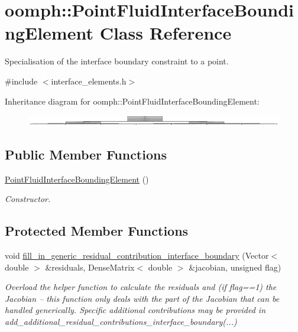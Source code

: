 \hypertarget{classoomph_1_1PointFluidInterfaceBoundingElement}{}\section{oomph\+:\+:Point\+Fluid\+Interface\+Bounding\+Element Class Reference}
\label{classoomph_1_1PointFluidInterfaceBoundingElement}


Specialisation of the interface boundary constraint to a point.  




{\ttfamily \#include $<$interface\+\_\+elements.\+h$>$}

Inheritance diagram for oomph\+:\+:Point\+Fluid\+Interface\+Bounding\+Element\+:\begin{figure}[H]
\begin{center}
\leavevmode
\includegraphics[height=0.468384cm]{classoomph_1_1PointFluidInterfaceBoundingElement}
\end{center}
\end{figure}
\subsection*{Public Member Functions}
\begin{DoxyCompactItemize}
\item 
\hyperlink{classoomph_1_1PointFluidInterfaceBoundingElement_a920776d9680859c72f79d446a7c3d1e8}{Point\+Fluid\+Interface\+Bounding\+Element} ()
\begin{DoxyCompactList}\small\item\em Constructor. \end{DoxyCompactList}\end{DoxyCompactItemize}
\subsection*{Protected Member Functions}
\begin{DoxyCompactItemize}
\item 
void \hyperlink{classoomph_1_1PointFluidInterfaceBoundingElement_aad95a7d6f4e4349ee1136e623aa69c88}{fill\+\_\+in\+\_\+generic\+\_\+residual\+\_\+contribution\+\_\+interface\+\_\+boundary} (Vector$<$ double $>$ \&residuals, Dense\+Matrix$<$ double $>$ \&jacobian, unsigned flag)
\begin{DoxyCompactList}\small\item\em Overload the helper function to calculate the residuals and (if flag==1) the Jacobian -- this function only deals with the part of the Jacobian that can be handled generically. Specific additional contributions may be provided in add\+\_\+additional\+\_\+residual\+\_\+contributions\+\_\+interface\+\_\+boundary(...) \end{DoxyCompactList}\end{DoxyCompactItemize}
